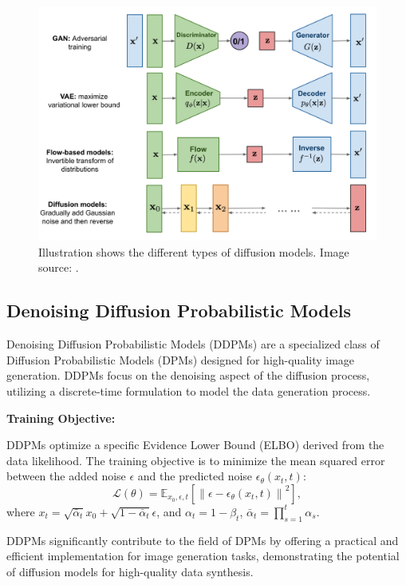 \documentclass[sigconf,natbib=false]{acmart}
\begin{document}
\begin{figure}[h]
  \centering
  \includegraphics[width=\linewidth]{imgs/lilianweng2107-F1.png}
  \caption{Illustration shows the different types of diffusion models.
  Image source: \cite[Weng (2021)]{weng2021}.}
  \Description{}
\end{figure}

\subsection{Denoising Diffusion Probabilistic Models}
Denoising Diffusion Probabilistic Models (DDPMs) are a specialized class
of Diffusion Probabilistic Models (DPMs) designed for high-quality image generation.
DDPMs focus on the denoising aspect of the diffusion process,
utilizing a discrete-time formulation to model the data generation process.

\textbf{Training Objective:}

DDPMs optimize a specific Evidence Lower Bound (ELBO) derived from the data likelihood.
The training objective is to minimize the mean squared error
between the added noise \(\epsilon\) and the predicted noise \(\epsilon_\theta(x_t, t)\):
\[
\mathcal{L}(\theta) = \mathbb{E}_{x_0, \epsilon, t} \left[ \left\| \epsilon - \epsilon_\theta(x_t, t) \right\|^2 \right],
\]
where \(x_t = \sqrt{\bar{\alpha}_t} x_0 + \sqrt{1 - \bar{\alpha}_t} \epsilon\),
and \(\alpha_t = 1 - \beta_t\), \(\bar{\alpha}_t = \prod_{s=1}^t \alpha_s\).

DDPMs significantly contribute to the field of DPMs by offering a practical
and efficient implementation for image generation tasks,
demonstrating the potential of diffusion models for high-quality data synthesis.
\end{document}
